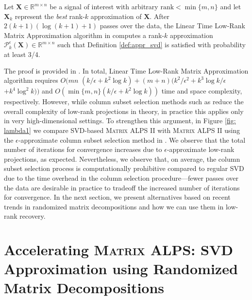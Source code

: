 \documentclass[twocolumn]{svjour3}
\newcommand{\signal}{\boldsymbol{X}}
\newcommand{\dimension}{m \times n}
\newcommand{\rank}{k}
\begin{document}
\begin{theorem}{\label{thm:adaptiveVolume}} 
Let $\signal \in \mathbb{R}^{\dimension} $ be a signal of interest with arbitrary $ \text{rank} < \min\lbrace m, n \rbrace $ and let $\signal_{\rank}$ represent the {\it best} rank-$\rank$ approximation of $\signal $. After $2 (\rank + 1)(\log(\rank + 1) + 1) $ passes over the data, the Linear Time Low-Rank Matrix Approximation algorithm in \cite{deshpande2} computes a rank-$\rank$ approximation $\mathcal{P}_{\rank}^{\epsilon}(\signal) \in \mathbb{R}^{\dimension} $ such that Definition \ref{def:appr_svd} is satisfied with probability at least 3/4.
\end{theorem} 

The proof is provided in \cite{deshpande2}. In total, Linear Time Low-Rank Matrix Approximation algorithm \cite{deshpande2} requires $O(mn $ $(\rank/ \epsilon + \rank^2 \log \rank) + (m + n)(\rank^2/\epsilon^2 + \rank^3 \log \rank/\epsilon $ $+ \rank^4 \log^2 \rank))$ and $O(\min\lbrace m, n \rbrace (\rank/\epsilon + \rank^2 \log \rank)) $ time and space complexity, respectively. However, while column subset selection methods such as \cite{deshpande2} reduce the overall complexity of low-rank projections in theory, in practice this applies only in very high-dimensional settings. To strengthen this argument, in Figure \ref{fig: lambda1} we compare SVD-based \textsc{Matrix ALPS II}	with \textsc{Matrix ALPS II} using the $\epsilon$-approximate column subset selection method in \cite{deshpande2}. We observe that the total number of iterations for convergence increases due to $\epsilon$-approximate low-rank projections, as expected. Nevertheless, we observe that, on average, the column subset selection process \cite{deshpande2} is computationally prohibitive compared to regular SVD due to the time overhead in the column selection procedure---fewer passes over the data are desirable in practice to tradeoff the increased number of iterations for convergence. In the next section, we present alternatives based on recent trends in randomized matrix decompositions and how we can use them in low-rank recovery.

\section{Accelerating \textsc{Matrix ALPS}: SVD Approximation using Randomized Matrix Decompositions }{\label{section:QR}}
\end{document}
